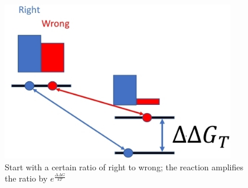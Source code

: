 \documentclass[]{article}
\begin{document}
\begin{figure}[H]
	\caption[Start with a certain ratio of right to wrong]{Start with a certain ratio of right to wrong; the reaction amplifies the ratio by $e^\frac{\Delta \Delta G}{kT}$} \label{fig:RightWrong} 
	\includegraphics[width=0.9\textwidth]{RightWrong}
\end{figure}
\end{document}
